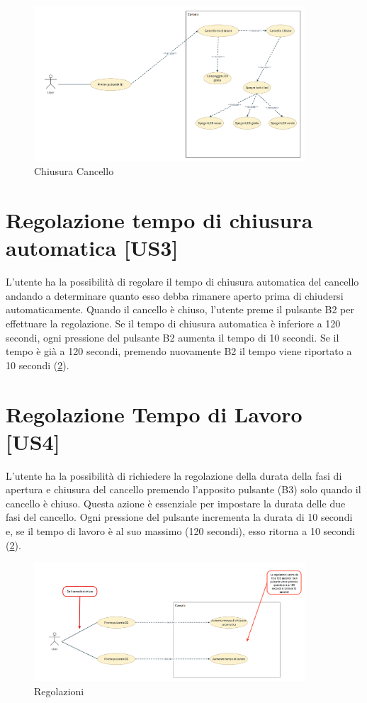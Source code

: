 \begin{figure}[H]
    \centering
    \includegraphics[width=0.9\textwidth]{figures/usecase_2.png}
    \caption{Chiusura Cancello}
    \label{usecase2}
\end{figure}


\section{Regolazione tempo di chiusura automatica [US3]}
L'utente ha la possibilità di regolare il tempo di chiusura automatica del cancello andando a determinare quanto esso debba rimanere aperto prima di chiudersi automaticamente.
Quando il cancello è chiuso, l'utente preme il pulsante B2 per effettuare la regolazione. Se il tempo di chiusura automatica è inferiore a 120 secondi, ogni pressione del pulsante B2 aumenta il tempo di 10 secondi. Se il tempo è già a 120 secondi, premendo nuovamente B2 il tempo viene riportato a 10 secondi (\ref{usecase3}).


\section{Regolazione Tempo di Lavoro [US4]}
L'utente ha la possibilità  di richiedere la regolazione della durata della fasi di apertura e chiusura del cancello premendo l'apposito pulsante (B3) solo quando il cancello è chiuso. Questa azione è essenziale per impostare la durata delle due fasi del cancello. Ogni pressione del pulsante incrementa la durata di 10 secondi e, se il tempo di lavoro è al suo massimo (120 secondi), esso ritorna a 10 secondi (\ref{usecase3}).

\begin{figure}[H]
    \centering
    \includegraphics[width=0.9\textwidth]{figures/usecase_3.png}
    \caption{Regolazioni}
    \label{usecase3}
\end{figure}


